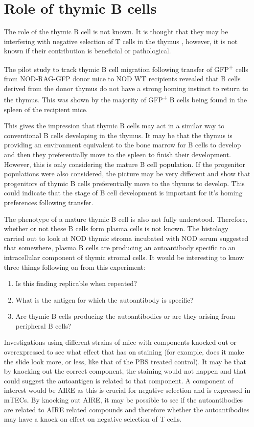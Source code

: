 \section{Role of thymic B cells}

The role of the thymic B cell is not known.
It is thought that they may be interfering with negative selection of T cells in the thymus \citep{Frommer2010, Yamano2015}, however, it is not known if their contribution is beneficial or pathological.

The pilot study to track thymic B cell migration following transfer of GFP\textsuperscript{+} cells from NOD-RAG-GFP donor mice to NOD WT recipients revealed that B cells derived from the donor thymus do not have a strong homing instinct to return to the thymus.
This was shown by the majority of GFP\textsuperscript{+} B cells being found in the spleen of the recipient mice.

This gives the impression that thymic B cells may act in a similar way to conventional B cells developing in the thymus.
It may be that the thymus is providing an environment equivalent to the bone marrow for B cells to develop and then they preferentially move to the spleen to finish their development.
However, this is only considering the mature B cell population.
If the progenitor populations were also considered, the picture  may be very different and show that progenitors of thymic B cells preferentially move to the thymus to develop.
This could indicate that the stage of B cell development is important for it's homing preferences following transfer.

The phenotype of a mature thymic B cell is also not fully understood.
Therefore, whether or not these B cells form plasma cells is not known.
The histology carried out to look at NOD thymic stroma incubated with NOD serum suggested that somewhere, plasma B cells are producing an autoantibody specific to an intracellular component of thymic stromal cells.
It would be interesting to know three things following on from this experiment:
\begin{enumerate}
\item Is this finding replicable when repeated?
\item What is the antigen for which the autoantibody is specific?
\item Are thymic B cells producing the autoantibodies or are they arising from peripheral B cells?
\end{enumerate}

Investigations using different strains of mice with components knocked out or overexpressed to see what effect that has on staining (for example, does it make the slide look more, or less, like that of the PBS treated control). 
It may be that by knocking out the correct component, the staining would not happen and that could suggest the autoantigen is related to that component. 
A component of interest would be AIRE as this is crucial for negative selection and is expressed in mTECs.
By knocking out AIRE, it may be possible to see if the autoantibodies are related to AIRE related compounds and therefore whether the autoantibodies may have a knock on effect on negative selection of T cells.

